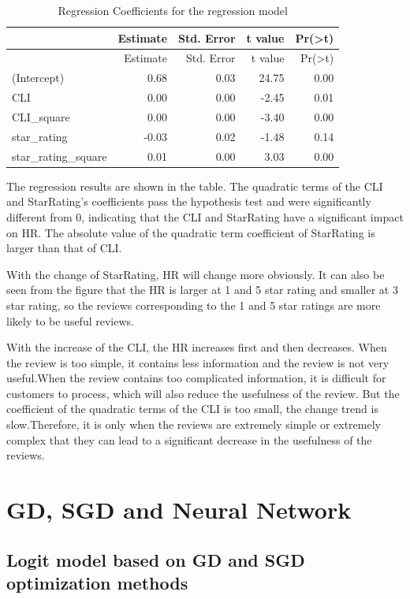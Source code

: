 \documentclass[12pt,a4paper,]{article}
\begin{document}
\begin{longtable}[]{@{}lrrrr@{}}
\caption{Regression Coefficients for the regression
model}\tabularnewline
\toprule
& Estimate & Std. Error & t value &
Pr(\textgreater{}\textbar{}t\textbar{})\tabularnewline
\midrule
\endfirsthead
\toprule
& Estimate & Std. Error & t value &
Pr(\textgreater{}\textbar{}t\textbar{})\tabularnewline
\midrule
\endhead
(Intercept) & 0.68 & 0.03 & 24.75 & 0.00\tabularnewline
CLI & 0.00 & 0.00 & -2.45 & 0.01\tabularnewline
CLI\_square & 0.00 & 0.00 & -3.40 & 0.00\tabularnewline
star\_rating & -0.03 & 0.02 & -1.48 & 0.14\tabularnewline
star\_rating\_square & 0.01 & 0.00 & 3.03 & 0.00\tabularnewline
\bottomrule
\end{longtable}

The regression results are shown in the table. The quadratic terms of
the CLI and StarRating's coefficients pass the hypothesis test and were
significantly different from 0, indicating that the CLI and StarRating
have a significant impact on HR. The absolute value of the quadratic
term coefficient of StarRating is larger than that of CLI.

With the change of StarRating, HR will change more obviously. It can
also be seen from the figure that the HR is larger at 1 and 5 star
rating and smaller at 3 star rating, so the reviews corresponding to the
1 and 5 star ratings are more likely to be useful reviews.

With the increase of the CLI, the HR increases first and then decreases.
When the review is too simple, it contains less information and the
review is not very useful.When the review contains too complicated
information, it is difficult for customers to process, which will also
reduce the usefulness of the review. But the coefficient of the
quadratic terms of the CLI is too small, the change trend is
slow.Therefore, it is only when the reviews are extremely simple or
extremely complex that they can lead to a significant decrease in the
usefulness of the reviews.

\hypertarget{gd-sgd-and-neural-network}{%
\section{GD, SGD and Neural Network}\label{gd-sgd-and-neural-network}}

\hypertarget{logit-model-based-on-gd-and-sgd-optimization-methods}{%
\subsection{Logit model based on GD and SGD optimization
methods}\label{logit-model-based-on-gd-and-sgd-optimization-methods}}
\end{document}
